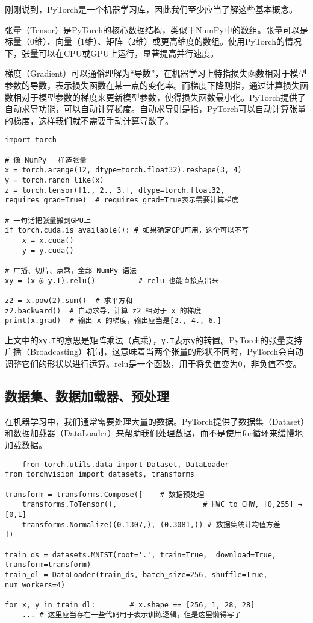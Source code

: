 \documentclass[../main.tex]{subfiles}
\begin{document}
刚刚说到，PyTorch是一个机器学习库，因此我们至少应当了解这些基本概念。

张量（Tensor）是PyTorch的核心数据结构，类似于NumPy中的数组。张量可以是标量（0维）、向量（1维）、矩阵（2维）或更高维度的数组。使用PyTorch的情况下，张量可以在CPU或GPU上运行，显著提高并行速度。

梯度（Gradient）可以通俗理解为“导数”，在机器学习上特指损失函数相对于模型参数的导数，表示损失函数在某一点的变化率。而梯度下降则指，通过计算损失函数相对于模型参数的梯度来更新模型参数，使得损失函数最小化。PyTorch提供了自动求导功能，可以自动计算梯度。自动求导则是指，PyTorch可以自动计算张量的梯度，这样我们就不需要手动计算导数了。

\begin{lstlisting}
import torch

# 像 NumPy 一样造张量
x = torch.arange(12, dtype=torch.float32).reshape(3, 4)
y = torch.randn_like(x)
z = torch.tensor([1., 2., 3.], dtype=torch.float32, requires_grad=True)  # requires_grad=True表示需要计算梯度

# 一句话把张量搬到GPU上
if torch.cuda.is_available(): # 如果确定GPU可用，这个可以不写
    x = x.cuda()
    y = y.cuda()

# 广播、切片、点乘，全部 NumPy 语法
xy = (x @ y.T).relu()          # relu 也能直接点出来

z2 = x.pow(2).sum()  # 求平方和
z2.backward()  # 自动求导，计算 z2 相对于 x 的梯度
print(x.grad)  # 输出 x 的梯度，输出应当是[2., 4., 6.]

\end{lstlisting}

上文中的\texttt{x\@ y.T}的意思是矩阵乘法（点乘），\texttt{y.T}表示\texttt{y}的转置。PyTorch的张量支持广播（Broadcasting）机制，这意味着当两个张量的形状不同时，PyTorch会自动调整它们的形状以进行运算。relu是一个函数，用于将负值变为0，非负值不变。

\subsection{数据集、数据加载器、预处理}

在机器学习中，我们通常需要处理大量的数据。PyTorch提供了数据集（Dataset）和数据加载器（DataLoader）来帮助我们处理数据，而不是使用for循环来缓慢地加载数据。

\begin{lstlisting}
    from torch.utils.data import Dataset, DataLoader
from torchvision import datasets, transforms

transform = transforms.Compose([    # 数据预处理
    transforms.ToTensor(),                    # HWC to CHW, [0,255] → [0,1]
    transforms.Normalize((0.1307,), (0.3081,)) # 数据集统计均值方差
])

train_ds = datasets.MNIST(root='.', train=True,  download=True, transform=transform)
train_dl = DataLoader(train_ds, batch_size=256, shuffle=True, num_workers=4)

for x, y in train_dl:        # x.shape == [256, 1, 28, 28]
    ... # 这里应当存在一些代码用于表示训练逻辑，但是这里懒得写了
\end{lstlisting}
\end{document}
